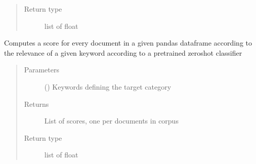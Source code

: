 \documentclass[letterpaper,10pt,english]{sphinxmanual}
\begin{document}
\begin{fulllineitems}
\begin{fulllineitems}
\begin{quote}
\begin{description}
\item[{Return type}] \leavevmode
\sphinxAtStartPar
list of float

\end{description}\end{quote}

\end{fulllineitems}


\begin{fulllineitems}
\label{\detokenize{dc_preprocessor:src.domain_classifier.preprocessor.CorpusDFProcessor.score_by_zeroshot}}
\sphinxAtStartPar
Computes a score for every document in a given pandas dataframe
according to the relevance of a given keyword according to a pretrained
zero\sphinxhyphen{}shot classifier
\begin{quote}\begin{description}
\item[{Parameters}] \leavevmode
\sphinxAtStartPar
{} () \textendash{} Keywords defining the target category

\item[{Returns}] \leavevmode
\sphinxAtStartPar
{} \textendash{} List of scores, one per documents in corpus

\item[{Return type}] \leavevmode
\sphinxAtStartPar
list of float

\end{description}\end{quote}

\end{fulllineitems}


\end{fulllineitems}

\end{document}
